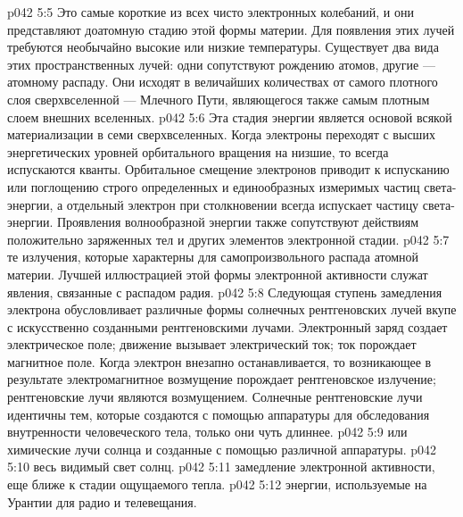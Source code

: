 \vs p042 5:5 \pc {}\bibnobreakspace {} Это самые короткие из всех чисто электронных колебаний, и они представляют доатомную стадию этой формы материи. Для появления этих лучей требуются необычайно высокие или низкие температуры. Существует два вида этих пространственных лучей: одни сопутствуют рождению атомов, другие --- атомному распаду. Они исходят в величайших количествах от самого плотного слоя сверхвселенной --- Млечного Пути, являющегося также самым плотным слоем внешних вселенных.
\vs p042 5:6 \pc {}\bibnobreakspace {} Эта стадия энергии является основой всякой материализации в семи сверхвселенных. Когда электроны переходят с высших энергетических уровней орбитального вращения на низшие, то всегда испускаются кванты. Орбитальное смещение электронов приводит к испусканию или поглощению строго определенных и единообразных измеримых частиц света\hyp{}энергии, а отдельный электрон при столкновении всегда испускает частицу света\hyp{}энергии. Проявления волнообразной энергии также сопутствуют действиям положительно заряженных тел и других элементов электронной стадии.
\vs p042 5:7 \pc {}\bibnobreakspace {} те излучения, которые характерны для самопроизвольного распада атомной материи. Лучшей иллюстрацией этой формы электронной активности служат явления, связанные с распадом радия.
\vs p042 5:8 \pc {}\bibnobreakspace {} Следующая ступень замедления электрона обусловливает различные формы солнечных рентгеновских лучей вкупе с искусственно созданными рентгеновскими лучами. Электронный заряд создает электрическое поле; движение вызывает электрический ток; ток порождает магнитное поле. Когда электрон внезапно останавливается, то возникающее в результате электромагнитное возмущение порождает рентгеновское излучение; рентгеновские лучи являются  возмущением. Солнечные рентгеновские лучи идентичны тем, которые создаются с помощью аппаратуры для обследования внутренности человеческого тела, только они чуть длиннее.
\vs p042 5:9 \pc {}\bibnobreakspace {} или химические лучи солнца и созданные с помощью различной аппаратуры.
\vs p042 5:10 \pc {}\bibnobreakspace {} весь видимый свет солнц.
\vs p042 5:11 \pc {}\bibnobreakspace {} замедление электронной активности, еще ближе к стадии ощущаемого тепла.
\vs p042 5:12 \pc {}\bibnobreakspace {} энергии, используемые на Урантии для радио и телевещания.
